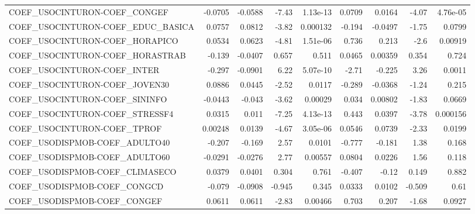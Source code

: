 \begin{tabular}{lrrrrrrrr}
COEF\_USOCINTURON-COEF\_CONGEF          &     -0.0705 &      -0.0588 &   -7.43 & 1.13e-13 &     0.0709 &      0.0164 &        -4.07 &      4.76e-05 \\
COEF\_USOCINTURON-COEF\_EDUC\_BASICA     &      0.0757 &       0.0812 &   -3.82 & 0.000132 &     -0.194 &     -0.0497 &        -1.75 &        0.0799 \\
COEF\_USOCINTURON-COEF\_HORAPICO        &      0.0534 &       0.0623 &   -4.81 & 1.51e-06 &      0.736 &       0.213 &         -2.6 &       0.00919 \\
COEF\_USOCINTURON-COEF\_HORASTRAB       &      -0.139 &      -0.0407 &   0.657 &    0.511 &     0.0465 &     0.00359 &        0.354 &         0.724 \\
COEF\_USOCINTURON-COEF\_INTER           &      -0.297 &      -0.0901 &    6.22 & 5.07e-10 &      -2.71 &      -0.225 &         3.26 &        0.0011 \\
COEF\_USOCINTURON-COEF\_JOVEN30         &      0.0886 &       0.0445 &   -2.52 &   0.0117 &     -0.289 &     -0.0368 &        -1.24 &         0.215 \\
COEF\_USOCINTURON-COEF\_SININFO         &     -0.0443 &       -0.043 &   -3.62 &  0.00029 &      0.034 &     0.00802 &        -1.83 &        0.0669 \\
COEF\_USOCINTURON-COEF\_STRESSF4        &      0.0315 &        0.011 &   -7.25 & 4.13e-13 &      0.443 &      0.0397 &        -3.78 &      0.000156 \\
COEF\_USOCINTURON-COEF\_TPROF           &     0.00248 &       0.0139 &   -4.67 & 3.05e-06 &     0.0546 &      0.0739 &        -2.33 &        0.0199 \\
COEF\_USODISPMOB-COEF\_ADULTO40         &      -0.207 &       -0.169 &    2.57 &   0.0101 &     -0.777 &      -0.181 &         1.38 &         0.168 \\
COEF\_USODISPMOB-COEF\_ADULTO60         &     -0.0291 &      -0.0276 &    2.77 &  0.00557 &     0.0804 &      0.0226 &         1.56 &         0.118 \\
COEF\_USODISPMOB-COEF\_CLIMASECO        &      0.0379 &       0.0401 &   0.304 &    0.761 &     -0.407 &       -0.12 &        0.149 &         0.882 \\
COEF\_USODISPMOB-COEF\_CONGCD           &      -0.079 &      -0.0908 &  -0.945 &    0.345 &     0.0333 &      0.0102 &       -0.509 &          0.61 \\
COEF\_USODISPMOB-COEF\_CONGEF           &      0.0611 &       0.0611 &   -2.83 &  0.00466 &      0.703 &       0.207 &        -1.68 &        0.0927 \\

\end{tabular}

